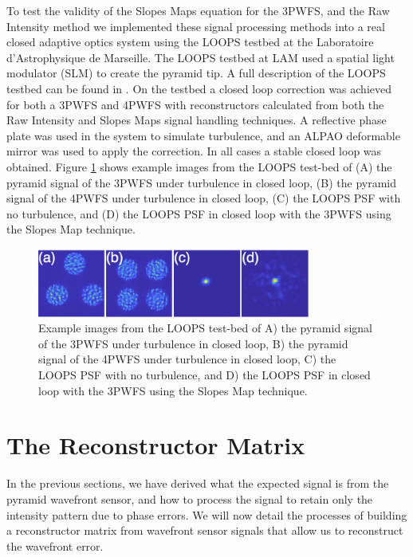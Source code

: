 To test the validity of the Slopes Maps equation for the 3PWFS, and the Raw Intensity method we implemented these signal processing methods into a real closed adaptive optics system using the LOOPS testbed at the Laboratoire d'Astrophysique de Marseille. The LOOPS testbed at LAM used a spatial light modulator (SLM) to create the pyramid tip. A full description of the LOOPS testbed can be found in  \cite{janin2019adaptive}. On the testbed a closed loop correction was achieved for both a 3PWFS and 4PWFS with reconstructors calculated from both the Raw Intensity and Slopes Maps signal handling techniques. A reflective phase plate was used in the system to simulate turbulence, and an ALPAO deformable mirror was used to apply the correction. In all cases a stable closed loop was obtained. Figure \ref{fig:LOOOPS} shows example images from the LOOPS test-bed of (A) the pyramid signal of the 3PWFS under turbulence in closed loop, (B) the pyramid signal of the 4PWFS under turbulence in closed loop, (C) the LOOPS PSF with no turbulence, and (D) the LOOPS PSF in closed loop with the 3PWFS using the Slopes Map technique. 

\begin{figure}
    \centering
    \includegraphics[width=0.8\textwidth]{Chapter Materials/Chapter Two Materials/LOOPS.png}
    \caption{Example images from the LOOPS test-bed of A) the pyramid signal of the 3PWFS under turbulence in closed loop, B) the pyramid signal of the 4PWFS under turbulence in closed loop, C) the LOOPS PSF with no turbulence, and D) the LOOPS PSF in closed loop with the 3PWFS using the Slopes Map technique.}
    \label{fig:LOOOPS}
\end{figure}

\section{The Reconstructor Matrix}

In the previous sections, we have derived what the expected signal is from the pyramid wavefront sensor, and how to process the signal to retain only the intensity pattern due to phase errors. We will now detail the processes of building a reconstructor matrix from wavefront sensor signals that allow us to reconstruct the wavefront error.
 
